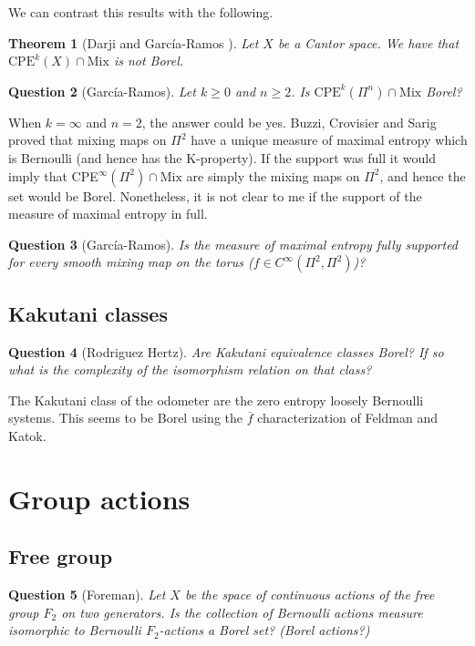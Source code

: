 \documentclass{article}
\newtheorem{theorem}{Theorem}[section]
\newtheorem{question}[theorem]{Question}
\theoremstyle{definition}
\begin{document}
We can contrast this results with the following. 
 
 \begin{theorem}
[Darji and García-Ramos \cite{Darji}] Let $X$ be a Cantor space. We have that $\mathrm{CPE}^k(X)\cap\mathrm{Mix}$ is not Borel. 
\end{theorem}

 
\begin{question}[García-Ramos]
Let $k\geq 0$ and $n\geq 2$.
Is $\mathrm{CPE}^k(\Pi^n)\cap\mathrm{Mix}$ Borel? 
\end{question}

When $k=\infty$ and $n=2$, the answer could be yes. Buzzi, Crovisier and Sarig \cite{BCS} proved that mixing maps on $\Pi^2$ have a unique measure of maximal entropy which is Bernoulli (and hence has the K-property). If the support was full it would imply that CPE$^{\infty}(\Pi^2)\cap \mathrm{Mix}$ are simply the mixing maps on $\Pi^2$, and hence the set would be Borel. Nonetheless, it is not clear to me if the support of the measure of maximal entropy in full. 

\begin{question}
[García-Ramos]
 Is the measure of maximal entropy fully supported for every smooth mixing map on the torus ($f\in C^{\infty}(\Pi^2,\Pi^2)$)?
\end{question}


\subsection{Kakutani classes}
\begin{question}
[Rodriguez Hertz] Are Kakutani equivalence classes Borel?   If so what is the complexity of the isomorphism relation on that class?
\end{question}
The Kakutani class of the odometer are the zero entropy loosely Bernoulli systems. This seems to be Borel using the $\overline{f}$ characterization of Feldman and Katok. 


\section{Group actions}
\subsection{Free group}
\begin{question}
[Foreman]
     Let $X$ be the space of continuous actions of the free group $F_2$ on two generators. Is the collection of Bernoulli actions measure isomorphic to Bernoulli $F_2$-actions a Borel set? (Borel actions?)
\end{question}
\end{document}
